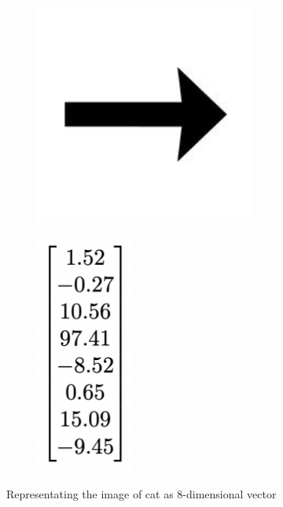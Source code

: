 \documentclass[hyperref={colorlinks,citecolor=blue,linkcolor=blue,urlcolor=blue}]{beamer}
\begin{document}
\begin{frame}
\begin{itemize}
\begin{figure}
\begin{subfigure}[b]{0.3\textwidth}
    \end{subfigure}
    \pause
    \hspace{-2em}
    \begin{subfigure}[b]{0.3\textwidth}
        \centering
        \includegraphics[width=0.8\textwidth]{./Images/arrow.jpeg}
    \end{subfigure}
    \hspace{-4em}
    \pause
    \begin{subfigure}[b]{0.3\textwidth}
        \centering
        \includegraphics[width=0.35\textwidth]{./Images/column.png}
    \end{subfigure}
    \vspace{0.5em}
    \caption{Representating the image of cat as 8-dimensional vector}
  \end{figure}
\end{itemize}
\end{frame}
\end{document}
